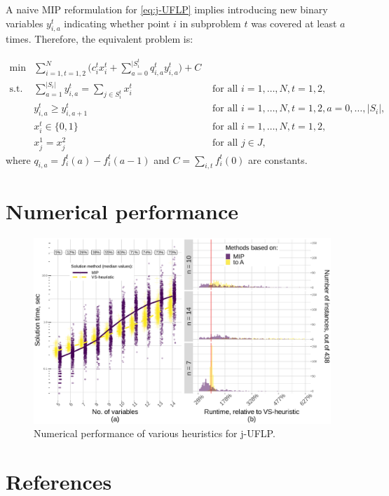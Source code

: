 \documentclass[11pt]{article}
\begin{document}
A naive MIP reformulation for \eqref{eq:j-UFLP} implies introducing new binary
variables \(y_{i,a}^t\) indicating whether point \(i\) in subproblem \(t\) was covered
at least \(a\) times. Therefore, the equivalent problem is:

\begin{subequations}\label{eq:j-UFLP-MIP}
\begin{align}\tag{j-UFLP-MIP}
  \min & \sum_{i=1, t=1,2}^N \Big(c^t_i x^t_i + \sum_{a=0}^{|S_i^t}q_{i,a}^t y^t_{i,a}\Big)+C&\\
    \textrm{s.t. } & \sum_{a=1}^{|S_i|} y_{i,a}^t = \sum_{j\in S^t_i} x^t_i& \textrm{ for all } i=1,\ldots, N, t=1,2,\\
    & y^t_{i,a} \geq y^t_{i, a+1} & \textrm{ for all }i=1, \ldots, N, t=1,2, a=0,\ldots,|S_i|,\\
    & x^t_i\in\{0,1\} & \textrm{ for all } i=1,\ldots,N, t=1,2,\\
    & x^1_j = x^2_j & \textrm{ for all } j\in J,\label{eq:link}
\end{align}
\end{subequations}
where \(q_{i,a}=f_i^t(a)-f_i^t(a-1)\) and \(C=\sum_{i,t} f_i^t(0)\) are constants.

\section{Numerical performance}
\label{sec:orgc3838e4}

  \begin{figure}%
    \centering
    \includegraphics[width=\textwidth]{./jUFLP.eps}%
    \caption{Numerical performance of various heuristics for j-UFLP.}%
    \label{fig:jUFLP-nums}%
\end{figure}
\section{References}
\label{sec:org38a7a76}
\printbibliography
\end{document}

